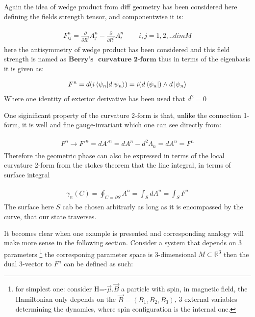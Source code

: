 \documentclass[8pt, twocoloumn]{article}
\begin{document}
Again the idea of wedge product from diff geometry has been considered here defining the fields strength tensor, and componentwise it is:

\begin{align}
\begin{split}
F^n_{ij} = \frac{\partial }{\partial R^i} A^n_j - \frac{\partial }{\partial R^j} A^n_i \ \ \ \ \ \ \ \ \ \ i,j= 1, 2,.. dim M
\end{split}
\end{align}
here the antisymmetry of wedge product has been considered and this field strength is named as $\textbf{Berry's }$ $\textbf{curvature}$ $\textbf{2-form}$ thus in terms of the eigenbasis it is given as:

\begin{align}
\begin{split}
F^n = d(i \braket{\psi_n|d|\psi_n})= i(d\bra{\psi_n}) \wedge d\ket{\psi_n}
\end{split}
\end{align}
Where one identity of exterior derivative has been used that $d^2=0$

One siginificant property of the curvature 2-form is that, unlike the connection 1-form, it is well and fine gauge-invariant which one can see directly from:


\begin{align}
\begin{split}
F^n \to F'^n = dA'^n=dA^n - d^2 \Lambda_n = dA^n = F^n
\end{split}
\end{align}
Therefore the geometric phase can also be expressed in terms of the local curvature 2-form from the stokes theorem that the line integral, in terms of surface integral

\begin{align}
\begin{split}
\gamma_n(C)=\oint_{C=\partial S}A^n=\int_{S}dA^n = \int_{S}F^n
\end{split}
\end{align}
The surface here $S$ cab be chosen arbitrarly as long as it is encompassed by the curve, that our state traverses. 

It becomes clear when one example is presented and corresponding analogy will make more sense in the following section. Consider a system that depends on 3 parameters \footnote{for simplest one: consider H=-$\vec{\mu}.\vec{B}$ a particle with spin, in magnetic field, the Hamiltonian only depends on the $\vec{B}=(B_1, B_2, B_3)$, 3 external variables determining the dynamics, where spin configuration is the internal one.} the corresponing parameter space is 3-dimensional $M \subset \mathbb{R}^3$ then the dual 3-vector to $F^n$ can be defined as such:
\end{document}
